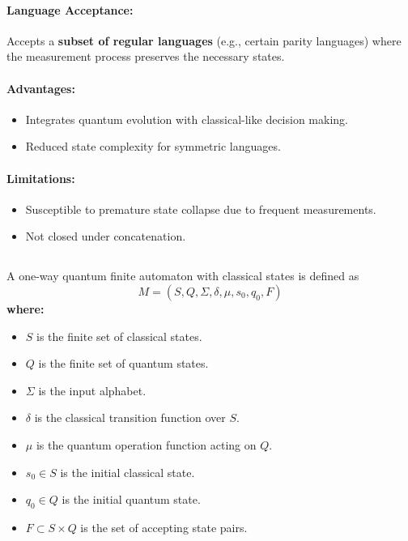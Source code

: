 \paragraph{Language Acceptance:}  
Accepts a \textbf{subset of regular languages} (e.g., certain parity languages) where the measurement process preserves the necessary states.

\paragraph{Advantages:}
\begin{itemize}
    \item Integrates quantum evolution with classical-like decision making.
    \item Reduced state complexity for symmetric languages.
\end{itemize}

\paragraph{Limitations:}
\begin{itemize}
    \item Susceptible to premature state collapse due to frequent measurements.
    \item Not closed under concatenation.
\end{itemize}

\subsection{}
\label{subsec:1qfac}
\begin{definition}
A one-way quantum finite automaton with classical states is defined as 
\[
M = (S, Q, \Sigma, \delta, \mu, s_0, q_0, F)
\]
\textbf{where:}
\begin{itemize}
    \item \( S \) is the finite set of classical states.
    \item \( Q \) is the finite set of quantum states.
    \item \( \Sigma \) is the input alphabet.
    \item \( \delta \) is the classical transition function over \( S \).
    \item \( \mu \) is the quantum operation function acting on \( Q \).
    \item \( s_0 \in S \) is the initial classical state.
    \item \( q_0 \in Q \) is the initial quantum state.
    \item \( F \subset S \times Q \) is the set of accepting state pairs.
\end{itemize}
\end{definition}

